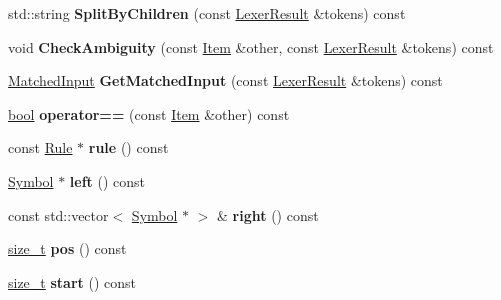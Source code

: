 \begin{DoxyCompactItemize}
\mbox{\label{classv8_1_1internal_1_1torque_1_1Item_a2cd25bc0d8b1e1073863297e3afa205c}} 
std\+::string {\bfseries Split\+By\+Children} (const \mbox{\hyperlink{structv8_1_1internal_1_1torque_1_1LexerResult}{Lexer\+Result}} \&tokens) const
\item 
\mbox{\label{classv8_1_1internal_1_1torque_1_1Item_a7aa41b3ce1fab32d6b6b76420f8eb6a4}} 
void {\bfseries Check\+Ambiguity} (const \mbox{\hyperlink{classv8_1_1internal_1_1torque_1_1Item}{Item}} \&other, const \mbox{\hyperlink{structv8_1_1internal_1_1torque_1_1LexerResult}{Lexer\+Result}} \&tokens) const
\item 
\mbox{\label{classv8_1_1internal_1_1torque_1_1Item_ab8e0fe60c7cd036cdd7c918e4f6fdba0}} 
\mbox{\hyperlink{structv8_1_1internal_1_1torque_1_1MatchedInput}{Matched\+Input}} {\bfseries Get\+Matched\+Input} (const \mbox{\hyperlink{structv8_1_1internal_1_1torque_1_1LexerResult}{Lexer\+Result}} \&tokens) const
\item 
\mbox{\label{classv8_1_1internal_1_1torque_1_1Item_a389ecece34fc43ea3c6a485437cbdea6}} 
\mbox{\hyperlink{classbool}{bool}} {\bfseries operator==} (const \mbox{\hyperlink{classv8_1_1internal_1_1torque_1_1Item}{Item}} \&other) const
\item 
\mbox{\label{classv8_1_1internal_1_1torque_1_1Item_a23556c5bd1eaa11c1b2a7ea7963b6614}} 
const \mbox{\hyperlink{classv8_1_1internal_1_1torque_1_1Rule}{Rule}} $\ast$ {\bfseries rule} () const
\item 
\mbox{\label{classv8_1_1internal_1_1torque_1_1Item_a30119b857c04c9791a7bd615a52266bf}} 
\mbox{\hyperlink{classv8_1_1internal_1_1torque_1_1Symbol}{Symbol}} $\ast$ {\bfseries left} () const
\item 
\mbox{\label{classv8_1_1internal_1_1torque_1_1Item_ab937aba3aa5c47aabb3ee6ff650e067e}} 
const std\+::vector$<$ \mbox{\hyperlink{classv8_1_1internal_1_1torque_1_1Symbol}{Symbol}} $\ast$ $>$ \& {\bfseries right} () const
\item 
\mbox{\label{classv8_1_1internal_1_1torque_1_1Item_a5ae986d080bf046198793c3000797eb6}} 
\mbox{\hyperlink{classsize__t}{size\+\_\+t}} {\bfseries pos} () const
\item 
\mbox{\label{classv8_1_1internal_1_1torque_1_1Item_a87bf2ff7d07dcc47e719a5f774539d2c}} 
\mbox{\hyperlink{classsize__t}{size\+\_\+t}} {\bfseries start} () const
\end{DoxyCompactItemize}
